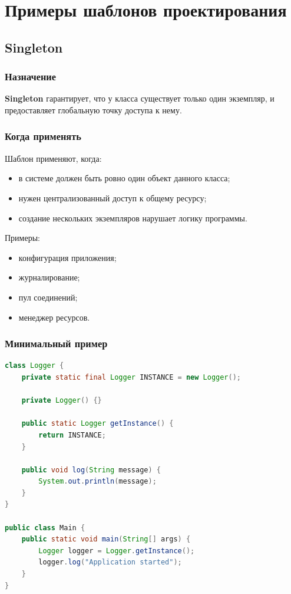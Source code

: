 \documentclass[12pt,a4paper]{article}
\begin{document}
\section{Примеры шаблонов проектирования}

\subsection{Singleton}

\subsubsection{Назначение}

\textbf{Singleton} гарантирует, что у класса существует только один экземпляр, и предоставляет глобальную точку доступа к нему.

\subsubsection{Когда применять}

Шаблон применяют, когда:
\begin{itemize}
    \item в системе должен быть ровно один объект данного класса;
    \item нужен централизованный доступ к общему ресурсу;
    \item создание нескольких экземпляров нарушает логику программы.
\end{itemize}

Примеры:
\begin{itemize}
    \item конфигурация приложения;
    \item журналирование;
    \item пул соединений;
    \item менеджер ресурсов.
\end{itemize}

\subsubsection{Минимальный пример}

\begin{lstlisting}[language=Java,caption={Singleton}]
class Logger {
    private static final Logger INSTANCE = new Logger();

    private Logger() {}

    public static Logger getInstance() {
        return INSTANCE;
    }

    public void log(String message) {
        System.out.println(message);
    }
}

public class Main {
    public static void main(String[] args) {
        Logger logger = Logger.getInstance();
        logger.log("Application started");
    }
}
\end{lstlisting}
\end{document}
